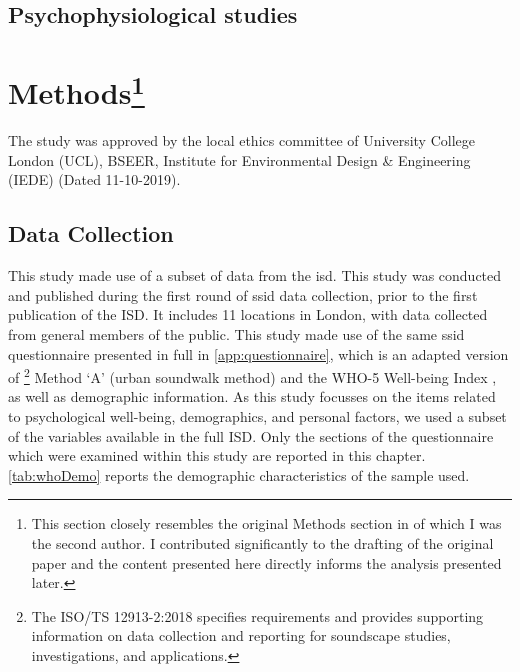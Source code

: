 
\subsection{Psychophysiological studies}

\section[Methods]{Methods\footnote{This section closely resembles the original Methods section in \citep{Erfanian2021Psychological} of which I was the second author. I contributed significantly to the drafting of the original paper and the content presented here directly informs the analysis presented later.}}

The study was approved by the local ethics committee of University College London (UCL), BSEER, Institute for Environmental Design \& Engineering (IEDE) (Dated 11-10-2019).

\subsection{Data Collection}
This study made use of a subset of data from the \gls{isd}. This study was conducted and published during the first round of \gls{ssid} data collection, prior to the first publication of the ISD. It includes 11 locations in London, with data collected from general members of the public. This study made use of the same \gls{ssid} questionnaire presented in full in \cref{app:questionnaire}, which is an adapted version of \citet{ISO12913Part2}\footnote{The ISO/TS 12913-2:2018 specifies requirements and provides supporting information on data collection and reporting for soundscape studies, investigations, and applications.} Method `A' (urban soundwalk method) and the WHO-5 Well-being Index \citep{Hall2011Examining}, as well as demographic information. As this study focusses on the items related to psychological well-being, demographics, and personal factors, we used a subset of the variables available in the full ISD. Only the sections of the questionnaire which were examined within this study are reported in this chapter. \cref{tab:whoDemo} reports the demographic characteristics of the sample used.


